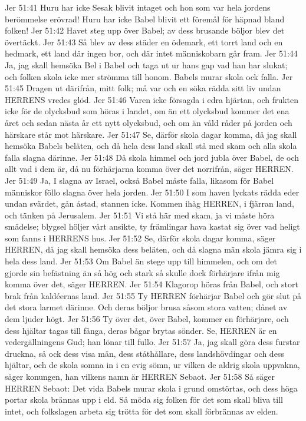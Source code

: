 Jer 51:41  Huru har icke Sesak blivit intaget och hon som var hela jordens berömmelse erövrad! Huru har icke Babel blivit ett föremål för häpnad bland folken!
Jer 51:42  Havet steg upp över Babel; av dess brusande böljor blev det övertäckt.
Jer 51:43  Så blev av dess städer en ödemark, ett torrt land och en hedmark, ett land där ingen bor, och där intet människobarn går fram.
Jer 51:44  Ja, jag skall hemsöka Bel i Babel och taga ut ur hans gap vad han har slukat; och folken skola icke mer strömma till honom. Babels murar skola ock falla.
Jer 51:45  Dragen ut därifrån, mitt folk; må var och en söka rädda sitt liv undan HERRENS vredes glöd.
Jer 51:46  Varen icke försagda i edra hjärtan, och frukten icke för de olycksbud som höras i landet, om än ett olycksbud kommer det ena året och sedan nästa år ett nytt olycksbud, och om än våld råder på jorden och härskare står mot härskare.
Jer 51:47  Se, därför skola dagar komma, då jag skall hemsöka Babels beläten, och då hela dess land skall stå med skam och alla skola falla slagna därinne.
Jer 51:48  Då skola himmel och jord jubla över Babel, de och allt vad i dem är, då nu förhärjarna komma över det norrifrån, säger HERREN.
Jer 51:49  Ja, I slagna av Israel, också Babel måste falla, likasom för Babel människor föllo slagna över hela jorden.
Jer 51:50  I som haven lyckats rädda eder undan svärdet, gån åstad, stannen icke. Kommen ihåg HERREN, i fjärran land, och tänken på Jerusalem.
Jer 51:51  Vi stå här med skam, ja vi måste höra smädelse; blygsel höljer vårt ansikte, ty främlingar hava kastat sig över vad heligt som fanns i HERRENS hus.
Jer 51:52  Se, därför skola dagar komma, säger HERREN, då jag skall hemsöka dess beläten, och då slagna män skola jämra sig i hela dess land.
Jer 51:53  Om Babel än stege upp till himmelen, och om det gjorde sin befästning än så hög och stark så skulle dock förhärjare ifrån mig komma över det, säger HERREN.
Jer 51:54  Klagorop höras från Babel, och stort brak från kaldéernas land.
Jer 51:55  Ty HERREN förhärjar Babel och gör slut på det stora larmet därinne. Och deras böljor brusa såsom stora vatten; dånet av dem ljuder högt.
Jer 51:56  Ty över det, över Babel, kommer en förhärjare, och dess hjältar tagas till fånga, deras bågar brytas sönder. Se, HERREN är en vedergällningens Gud; han lönar till fullo.
Jer 51:57  Ja, jag skall göra dess furstar druckna, så ock dess visa män, dess ståthållare, dess landshövdingar och dess hjältar, och de skola somna in i en evig sömn, ur vilken de aldrig skola uppvakna, säger konungen, han vilkens namn är HERREN Sebaot.
Jer 51:58  Så säger HERREN Sebaot: Det vida Babels murar skola i grund omstörtas, och dess höga portar skola brännas upp i eld. Så möda sig folken för det som skall bliva till intet, och folkslagen arbeta sig trötta för det som skall förbrännas av elden.

